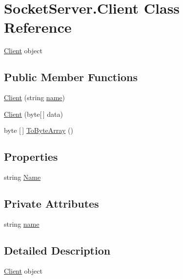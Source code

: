 \hypertarget{class_socket_server_1_1_client}{}\section{Socket\+Server.\+Client Class Reference}
\label{class_socket_server_1_1_client}


\hyperlink{class_socket_server_1_1_client}{Client} object  


\subsection*{Public Member Functions}
\begin{DoxyCompactItemize}
\item 
\hyperlink{class_socket_server_1_1_client_a7838776ac07d22b2776496d8f20c50cc}{Client} (string \hyperlink{class_socket_server_1_1_client_a9ba578b775f1217d70b08e344c279a8d}{name})
\item 
\hyperlink{class_socket_server_1_1_client_a9bc7823529aa727f7dd14bae897156ce}{Client} (byte\mbox{[}$\,$\mbox{]} data)
\item 
byte \mbox{[}$\,$\mbox{]} \hyperlink{class_socket_server_1_1_client_a0c02031ea9c29f5d33209a3aa72572f5}{To\+Byte\+Array} ()
\end{DoxyCompactItemize}
\subsection*{Properties}
\begin{DoxyCompactItemize}
\item 
string \hyperlink{class_socket_server_1_1_client_a239b5f307dd71e70bb2d90eaa0d6f88c}{Name}
\end{DoxyCompactItemize}
\subsection*{Private Attributes}
\begin{DoxyCompactItemize}
\item 
string \hyperlink{class_socket_server_1_1_client_a9ba578b775f1217d70b08e344c279a8d}{name}
\end{DoxyCompactItemize}


\subsection{Detailed Description}
\hyperlink{class_socket_server_1_1_client}{Client} object 



